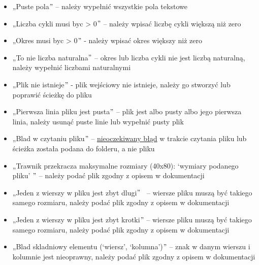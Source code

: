 \documentclass[12pt]{article}
\renewcommand{\_}{\kern-1.5pt\textunderscore\kern-1.5pt}
\begin{document}
\setlength{\parskip}{5.04pt}
\begin{itemize}
	\item „Puste pola$"$  – należy wypełnić wszystkie pola tekstowe \par

	\item „Liczba cykli musi byc > 0$"$  – należy wpisać liczbę cykli większą niż zero \par

	\item „Okres musi byc > 0$"$ - należy wpisać okres większy niż zero \par

	\item „To nie liczba naturalna$"$  – okres lub liczba cykli nie jest liczbą naturalną, należy wypełnić liczbami naturalnymi\par

	\item „Plik nie istnieje$"$  - plik wejściowy nie istnieje, należy go stworzyć lub poprawić ścieżkę do pliku\par

	\item „Pierwsza linia pliku jest pusta$"$  – plik jest albo pusty albo jego pierwsza linia, należy usunąć puste linie lub wypełnić pusty plik\par

	\item „Blad w czytaniu pliku$"$  – \uline{nieoczekiwany błąd} w trakcie czytania pliku lub ścieżka została podana do folderu, a nie pliku\par

	\item „Trawnik przekracza maksymalne rozmiary (40x80):  ‘wymiary podanego pliku’ $"$  – należy podać plik zgodny z opisem w dokumentacji\par

	\item „Jeden z wierszy w pliku jest zbyt dlugi$"$ \  – wiersze pliku muszą być takiego samego rozmiaru, należy podać plik zgodny z opisem w dokumentacji\par

	\item „Jeden z wierszy w pliku jest zbyt krotki$"$  – wiersze pliku muszą być takiego samego rozmiaru, należy podać plik zgodny z opisem w dokumentacji\par

	\item „Blad skladniowy elementu (‘wiersz’, ‘kolumna’)$"$  – znak w danym wierszu i kolumnie jest nieoprawny, należy podać plik zgodny z opisem w dokumentacji\par


\end{itemize}
\end{document}
